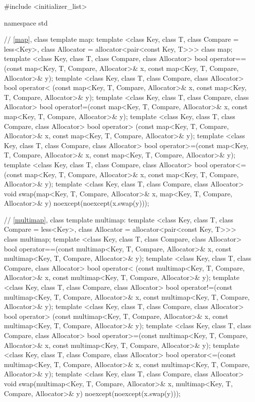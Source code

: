%
\begin{codeblock}
#include <initializer_list>

namespace std {
  // \ref{map}, class template map:
  template <class Key, class T, class Compare = less<Key>,
            class Allocator = allocator<pair<const Key, T>>>
    class map;
  template <class Key, class T, class Compare, class Allocator>
    bool operator==(const map<Key, T, Compare, Allocator>& x,
                    const map<Key, T, Compare, Allocator>& y);
  template <class Key, class T, class Compare, class Allocator>
    bool operator< (const map<Key, T, Compare, Allocator>& x,
                    const map<Key, T, Compare, Allocator>& y);
  template <class Key, class T, class Compare, class Allocator>
    bool operator!=(const map<Key, T, Compare, Allocator>& x,
                    const map<Key, T, Compare, Allocator>& y);
  template <class Key, class T, class Compare, class Allocator>
    bool operator> (const map<Key, T, Compare, Allocator>& x,
                    const map<Key, T, Compare, Allocator>& y);
  template <class Key, class T, class Compare, class Allocator>
    bool operator>=(const map<Key, T, Compare, Allocator>& x,
                    const map<Key, T, Compare, Allocator>& y);
  template <class Key, class T, class Compare, class Allocator>
    bool operator<=(const map<Key, T, Compare, Allocator>& x,
                    const map<Key, T, Compare, Allocator>& y);
  template <class Key, class T, class Compare, class Allocator>
    void swap(map<Key, T, Compare, Allocator>& x,
              map<Key, T, Compare, Allocator>& y)
      noexcept(noexcept(x.swap(y)));

  // \ref{multimap}, class template multimap:
  template <class Key, class T, class Compare = less<Key>,
            class Allocator = allocator<pair<const Key, T>>>
    class multimap;
  template <class Key, class T, class Compare, class Allocator>
    bool operator==(const multimap<Key, T, Compare, Allocator>& x,
                    const multimap<Key, T, Compare, Allocator>& y);
  template <class Key, class T, class Compare, class Allocator>
    bool operator< (const multimap<Key, T, Compare, Allocator>& x,
                    const multimap<Key, T, Compare, Allocator>& y);
  template <class Key, class T, class Compare, class Allocator>
    bool operator!=(const multimap<Key, T, Compare, Allocator>& x,
                    const multimap<Key, T, Compare, Allocator>& y);
  template <class Key, class T, class Compare, class Allocator>
    bool operator> (const multimap<Key, T, Compare, Allocator>& x,
                    const multimap<Key, T, Compare, Allocator>& y);
  template <class Key, class T, class Compare, class Allocator>
    bool operator>=(const multimap<Key, T, Compare, Allocator>& x,
                    const multimap<Key, T, Compare, Allocator>& y);
  template <class Key, class T, class Compare, class Allocator>
    bool operator<=(const multimap<Key, T, Compare, Allocator>& x,
                    const multimap<Key, T, Compare, Allocator>& y);
  template <class Key, class T, class Compare, class Allocator>
    void swap(multimap<Key, T, Compare, Allocator>& x,
              multimap<Key, T, Compare, Allocator>& y)
      noexcept(noexcept(x.swap(y)));

}
\end{codeblock}
